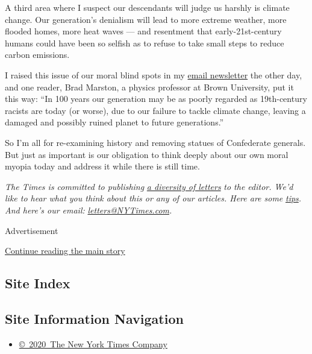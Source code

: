 A third area where I suspect our descendants will judge us harshly is
climate change. Our generation's denialism will lead to more extreme
weather, more flooded homes, more heat waves --- and resentment that
early-21st-century humans could have been so selfish as to refuse to
take small steps to reduce carbon emissions.

I raised this issue of our moral blind spots in my
\href{http://nytimes3xbfgragh.onion/kristofemail}{email newsletter} the
other day, and one reader, Brad Marston, a physics professor at Brown
University, put it this way: ``In 100 years our generation may be as
poorly regarded as 19th-century racists are today (or worse), due to our
failure to tackle climate change, leaving a damaged and possibly ruined
planet to future generations.''

So I'm all for re-examining history and removing statues of Confederate
generals. But just as important is our obligation to think deeply about
our own moral myopia today and address it while there is still time.

\emph{The Times is committed to publishing}
\href{https://www.nytimes3xbfgragh.onion/2019/01/31/opinion/letters/letters-to-editor-new-york-times-women.html}{\emph{a
diversity of letters}} \emph{to the editor. We'd like to hear what you
think about this or any of our articles. Here are some}
\href{https://help.nytimes3xbfgragh.onion/hc/en-us/articles/115014925288-How-to-submit-a-letter-to-the-editor}{\emph{tips}}\emph{.
And here's our email:}
\href{mailto:letters@NYTimes.com}{\emph{letters@NYTimes.com}}\emph{.}

Advertisement

\protect\hyperlink{after-bottom}{Continue reading the main story}

\hypertarget{site-index}{%
\subsection{Site Index}\label{site-index}}

\hypertarget{site-information-navigation}{%
\subsection{Site Information
Navigation}\label{site-information-navigation}}

\begin{itemize}
\tightlist
\item
  \href{https://help.nytimes3xbfgragh.onion/hc/en-us/articles/115014792127-Copyright-notice}{©~2020~The
  New York Times Company}
\end{itemize}

